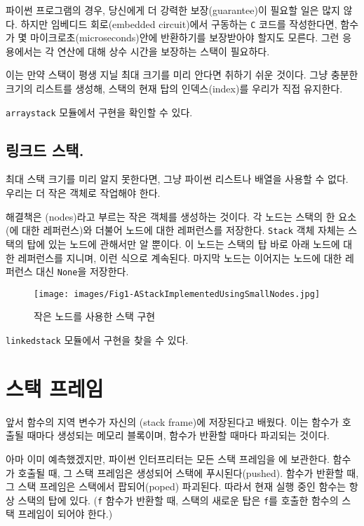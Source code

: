 \documentclass[a4paper, chapter]{oblivoir}
\begin{document}
파이썬 프로그램의 경우, 당신에게 더 강력한 보장(guarantee)이 필요할 일은 많지 않다. 하지만 임베디드 회로(embedded circuit)에서 구동하는 \texttt{C} 코드를 작성한다면, 함수가 몇 마이크로초(microseconds)안에 반환하기를 보장받아야 할지도 모른다. 그런 응용에서는 각 연산에 대해 상수 시간을 보장하는 스택이 필요하다.

이는 만약 스택이 평생 지닐 최대 크기를 미리 안다면 취하기 쉬운 것이다. 그냥 충분한 크기의 리스트를 생성해, 스택의 현재 탑의 인덱스(index)를 우리가 직접 유지한다.

\texttt{arraystack} 모듈에서 구현을 확인할 수 있다.

\subsection*{링크드 스택.}

최대 스택 크기를 미리 알지 못한다면, 그냥 파이썬 리스트나 배열을 사용할 수 없다. 우리는 더 작은 객체로 작업해야 한다.

해결책은 (nodes)라고 부르는 작은 객체를 생성하는 것이다. 각 노드는 스택의 한 요소(에 대한 레퍼런스)와 더불어  노드에 대한 레퍼런스를 저장한다. \texttt{Stack} 객체 자체는 스택의 탑에 있는 노드에 관해서만 알 뿐이다. 이 노드는 스택의 탑 바로 아래 노드에 대한 레퍼런스를 지니며, 이런 식으로 계속된다. 마지막 노드는 이어지는 노드에 대한 레퍼런스 대신 \texttt{None}을 저장한다.

\begin{figure}[ht]
    \centering
    \texttt{[image: images/Fig1-AStackImplementedUsingSmallNodes.jpg]}
    \caption{작은 노드를 사용한 스택 구현}
\end{figure}

\texttt{linkedstack} 모듈에서 구현을 찾을 수 있다.

\section*{스택 프레임}

앞서 함수의 지역 변수가 자신의 (stack frame)에 저장된다고 배웠다. 이는 함수가 호출될 때마다 생성되는 메모리 블록이며, 함수가 반환할 때마다 파괴되는 것이다.

아마 이미 예측했겠지만, 파이썬 인터프리터는 모든 스택 프레임을 에 보관한다. 함수가 호출될 때, 그 스택 프레임은 생성되어 스택에 푸시된다(pushed). 함수가 반환할 때, 그 스택 프레임은 스택에서 팝되어(poped) 파괴된다. 따라서 현재 실행 중인 함수는 항상 스택의 탑에 있다. (\texttt{f} 함수가 반환할 때, 스택의 새로운 탑은 \texttt{f}를 호출한 함수의 스택 프레임이 되어야 한다.)
\end{document}
